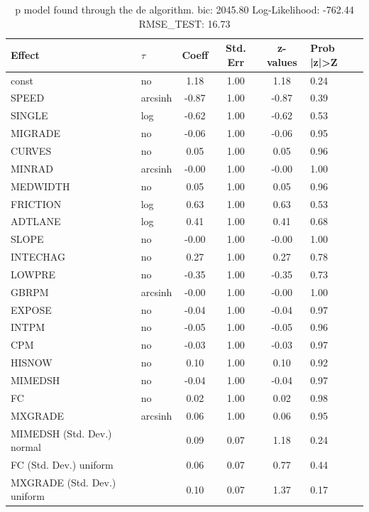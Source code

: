 \begin{table}
	\caption{p model found through the de algorithm. bic: 2045.80 Log-Likelihood: -762.44 RMSE_TEST: 16.73}
	\begin{center}
		\begin{tabular}{|l|l|c|c|c|l|}
			\hline
			Effect & $\tau$ & Coeff & Std. Err & z-values & Prob |z|>Z \\
			\hline
			const & no & 1.18 & 1.00 & 1.18 & 0.24 \\
			\hline
			SPEED & arcsinh & -0.87 & 1.00 & -0.87 & 0.39 \\
			\hline
			SINGLE & log & -0.62 & 1.00 & -0.62 & 0.53 \\
			\hline
			MIGRADE & no & -0.06 & 1.00 & -0.06 & 0.95 \\
			\hline
			CURVES & no & 0.05 & 1.00 & 0.05 & 0.96 \\
			\hline
			MINRAD & arcsinh & -0.00 & 1.00 & -0.00 & 1.00 \\
			\hline
			MEDWIDTH & no & 0.05 & 1.00 & 0.05 & 0.96 \\
			\hline
			FRICTION & log & 0.63 & 1.00 & 0.63 & 0.53 \\
			\hline
			ADTLANE & log & 0.41 & 1.00 & 0.41 & 0.68 \\
			\hline
			SLOPE & no & -0.00 & 1.00 & -0.00 & 1.00 \\
			\hline
			INTECHAG & no & 0.27 & 1.00 & 0.27 & 0.78 \\
			\hline
			LOWPRE & no & -0.35 & 1.00 & -0.35 & 0.73 \\
			\hline
			GBRPM & arcsinh & -0.00 & 1.00 & -0.00 & 1.00 \\
			\hline
			EXPOSE & no & -0.04 & 1.00 & -0.04 & 0.97 \\
			\hline
			INTPM & no & -0.05 & 1.00 & -0.05 & 0.96 \\
			\hline
			CPM & no & -0.03 & 1.00 & -0.03 & 0.97 \\
			\hline
			HISNOW & no & 0.10 & 1.00 & 0.10 & 0.92 \\
			\hline
			MIMEDSH & no & -0.04 & 1.00 & -0.04 & 0.97 \\
			\hline
			FC & no & 0.02 & 1.00 & 0.02 & 0.98 \\
			\hline
			MXGRADE & arcsinh & 0.06 & 1.00 & 0.06 & 0.95 \\
			\hline
			MIMEDSH (Std. Dev.) normal &  & 0.09 & 0.07 & 1.18 & 0.24 \\
			\hline
			FC (Std. Dev.) uniform &  & 0.06 & 0.07 & 0.77 & 0.44 \\
			\hline
			MXGRADE (Std. Dev.) uniform &  & 0.10 & 0.07 & 1.37 & 0.17 \\
			\hline
		\end{tabular}
	\end{center}
\end{table}